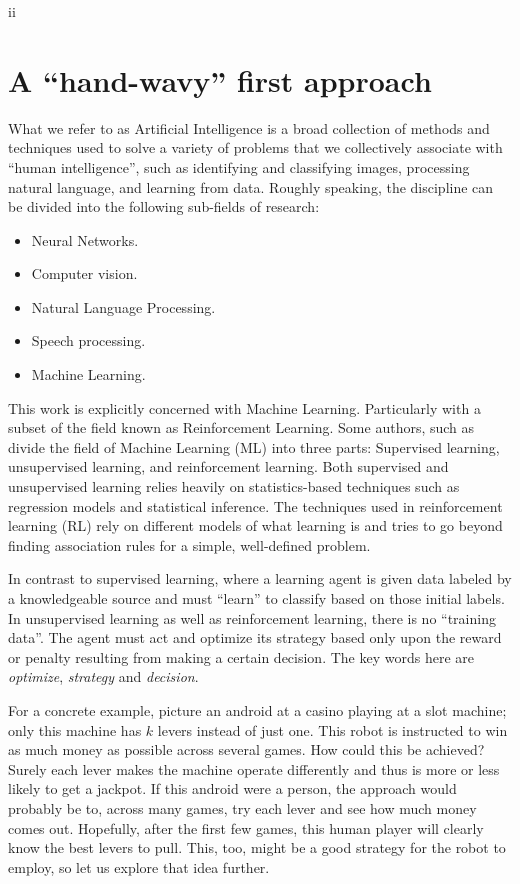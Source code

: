 ii\label{chapter:motivation}
\section{A ``hand-wavy'' first approach}

What we refer to as Artificial Intelligence is a broad collection of methods and
techniques used to solve a variety of problems that we collectively associate
with ``human intelligence'', such as identifying and classifying images, 
processing natural language, and learning from data. Roughly speaking, the
discipline can be divided into the following sub-fields of research:

\begin{itemize}
	\item Neural Networks.
	\item Computer vision.
	\item Natural Language Processing.
	\item Speech processing.
	\item Machine Learning.
\end{itemize}

This work is explicitly concerned with Machine Learning.  Particularly with a
subset of the field known as Reinforcement Learning. Some authors, such as
\cite[Ch.~1]{sutton2020reinforcement} divide the field of Machine Learning (ML)
into three parts: Supervised learning, unsupervised learning, and reinforcement 
learning. Both supervised and unsupervised learning relies heavily on
statistics-based techniques such as regression models and statistical inference.
The techniques used in reinforcement learning (RL) rely on different models of
what learning is and tries to go beyond finding association rules for a simple,
well-defined problem.

In contrast to supervised learning, where a learning agent is given data labeled
by a knowledgeable source and must ``learn'' to classify based on those initial
labels. In unsupervised learning as well as reinforcement learning, there is no
``training data''. The agent must act and optimize its strategy based only upon
the reward or penalty resulting from making a certain decision. The key words
here are \textit{optimize},  \textit{strategy} and \textit{decision}.

For a concrete example, picture an android at a casino playing at a slot
machine; only this machine has $k$ levers instead of just one. This robot is
instructed to win as much money as possible across several games. How could this
be achieved? Surely each lever makes the machine operate differently and thus is
more or less likely to get a jackpot.  If this android were a person, the
approach would probably be to, across many games, try each lever and see how
much money comes out. Hopefully, after the first few games, this human player
will clearly know the best levers to pull.  This, too, might be a good strategy
for the robot to employ, so let us explore that idea further.

